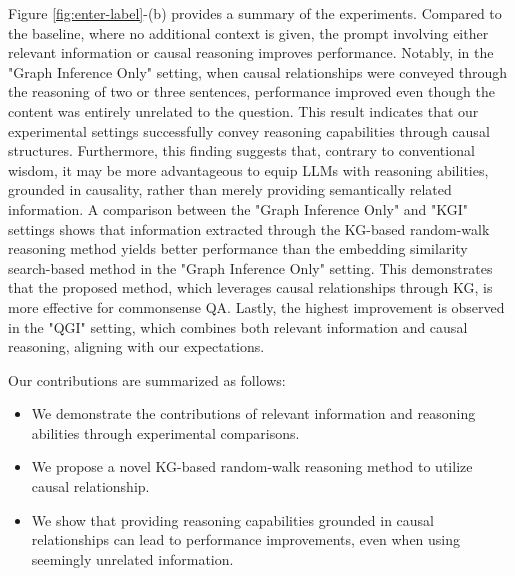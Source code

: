 \documentclass{article}
\begin{document}
Figure \ref{fig:enter-label}-(b) provides a summary of the experiments. Compared to the baseline, where no additional context is given, the prompt involving either relevant information or causal reasoning improves performance. Notably, in the "Graph Inference Only" setting, when causal relationships were conveyed through the reasoning of two or three sentences, performance improved even though the content was entirely unrelated to the question. This result indicates that our experimental settings successfully convey reasoning capabilities through causal structures. Furthermore, this finding suggests that, contrary to conventional wisdom, it may be more advantageous to equip LLMs with reasoning abilities, grounded in causality, rather than merely providing semantically related information. A comparison between the "Graph Inference Only" and "KGI" settings shows that information extracted through the KG-based random-walk reasoning method yields better performance than the embedding similarity search-based method in the "Graph Inference Only" setting. This demonstrates that the proposed method, which leverages causal relationships through KG, is more effective for commonsense QA. Lastly, the highest improvement is observed in the "QGI" setting, which combines both relevant information and causal reasoning, aligning with our expectations.

Our contributions are summarized as follows:
\begin{itemize}
    \item We demonstrate the contributions of relevant information and reasoning abilities through experimental comparisons.
    
    \item We propose a novel KG-based random-walk reasoning method to utilize causal relationship.
    
    \item We show that providing reasoning capabilities grounded in causal relationships can lead to performance improvements, even when using seemingly unrelated information.
\end{itemize}



\end{document}
